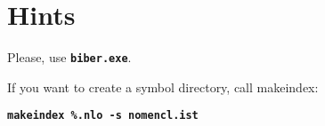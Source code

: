 %
%
%



\chapter{Hints}

Please, use  \textbf{\texttt{biber.exe}}.

\bigskip

If you want to create a symbol directory, call makeindex:


\textbf{\texttt{makeindex \%.nlo -s nomencl.ist}}
